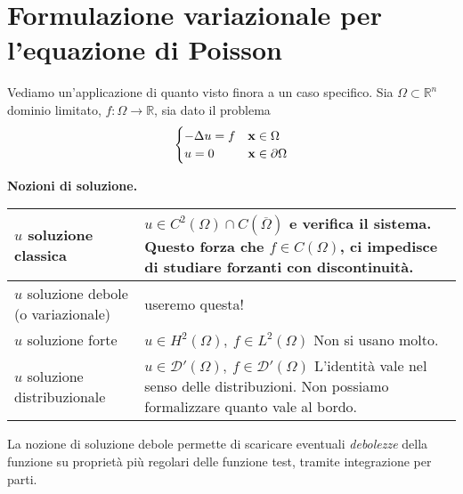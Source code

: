 \chapter{Formulazione variazionale per l'equazione di Poisson}

Vediamo un'applicazione di quanto visto finora a un caso specifico. Sia $\displaystyle \Omega \subset \mathbb{R}^{n}$ dominio limitato, $\displaystyle f:\Omega \rightarrow \mathbb{R}$, sia dato il problema
\begin{equation}
    \begin{cases}
        -\Delta u=f & \mathbf{x} \in \Omega          \\
        u=0         & \mathbf{x} \in \partial \Omega
    \end{cases}
    \label{eq:af-problema-poisson}
\end{equation}
\vspace*{0.5cm}
\begin{center}
    \textbf{Nozioni di soluzione.}
\end{center}
\begin{center}
    {\renewcommand{\arraystretch}{2.8}%
        \begin{tabular}{|l|l|}
            \hline
            $u$ soluzione classica        & \makecell[l]{$\displaystyle u\in C^{2}(\Omega) \cap C(\overline{\Omega })$ e verifica il sistema. \\Questo forza che $\displaystyle f\in C(\Omega)$, ci impedisce di studiare\\forzanti con discontinuità.} \\
            \hline
            \makecell[l]{$u$ soluzione debole                                                                                                 \\(o variazionale)} & useremo questa! \\
            \hline
            $u$ soluzione forte           & \makecell[l]{$\displaystyle u\in H^{2}(\Omega) ,\ f\in L^{2}(\Omega)$                             \\Non si usano molto.} \\
            \hline
            $u$ soluzione distribuzionale & \makecell[l]{$\displaystyle u\in \mathcal{D} '(\Omega) ,\ f\in \mathcal{D} '(\Omega)$             \\L'identità vale nel senso delle distribuzioni.\\Non possiamo formalizzare quanto vale al bordo.} \\
            \hline
        \end{tabular}
    }
\end{center}
\vspace*{0.5cm}
La nozione di soluzione debole permette di scaricare eventuali \textit{debolezze} della funzione su proprietà più regolari delle funzione test, tramite integrazione per parti.

